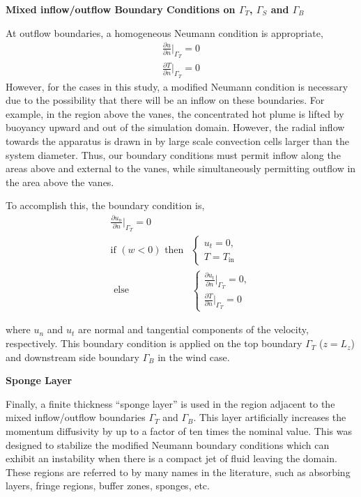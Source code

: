 \textbf{Mixed inflow/outflow Boundary Conditions on $\Gamma_T$,
$\Gamma_S$ and $\Gamma_B$}  

At outflow boundaries, a homogeneous Neumann condition is appropriate,
\begin{align}
  \frac{\partial u}{\partial n}\bigg|_{\Gamma_T} = 0 \\
  \frac{\partial T}{\partial n}\bigg|_{\Gamma_T} = 0
\end{align}
However, for the cases in this study, 
a modified Neumann condition is necessary due to the possibility that there will
be an inflow on these boundaries.
For example, in the region above the vanes, the concentrated hot plume is
lifted by buoyancy upward and out of the simulation domain. However, the
radial inflow towards the apparatus is drawn in by large scale
convection cells larger than the system diameter. Thus, our boundary
conditions must permit inflow along the areas above and external to the
vanes, while simultaneously permitting outflow in the area above the vanes. 


To accomplish this, the boundary condition is,
\begin{align}
  \frac{\partial u_n}{\partial n}\bigg|_{\Gamma_T} = 0 \\
  \text{if } (w<0) \text{ then}& \begin{cases}
    u_t = 0,\\
    T = T_{\text{in}}
  \end{cases} \\
  \text{ else}& \begin{cases}
    \frac{\partial u_t}{\partial n}\bigg|_{\Gamma_T} = 0, \\  
    \frac{\partial T}{\partial n}\bigg|_{\Gamma_T} = 0
  \end{cases}
\end{align}

where $u_n$ and $u_t$ are normal and tangential components of the velocity, 
respectively. This boundary condition is applied on the top boundary
$\Gamma_T$ ($z=L_z$) and downstream side boundary  $\Gamma_B$ in the wind case.

\textbf{Sponge Layer} 

Finally, a finite thickness ``sponge layer'' is used in the region adjacent 
to the mixed inflow/outflow boundaries $\Gamma_T$ and $\Gamma_B$.
This layer artificially increases the momentum diffusivity by
up to a factor of ten times the nominal value. This was designed to stabilize
the modified Neumann boundary conditions which can exhibit an instability
when there is a compact jet of fluid leaving the domain. 
These regions are referred to by many names in the
literature\cite{doi:10.1146/annurev.fluid.36.050802.121930}, such as
absorbing layers, fringe regions, buffer zones, sponges, etc. 


